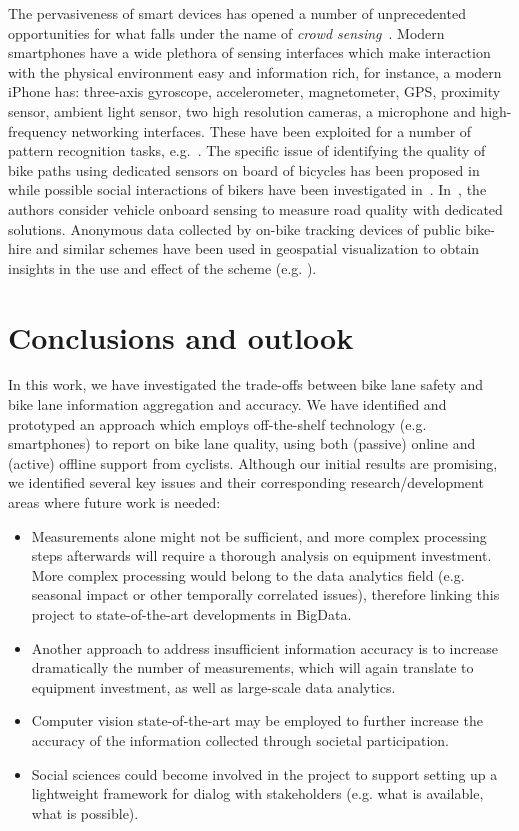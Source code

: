 \documentclass[a4paper,11pt]{article}
\begin{document}
The pervasiveness of smart devices has opened a number of unprecedented
opportunities for what falls under the name of \emph{crowd sensing}~\cite{gan:mob11}.
Modern smartphones have a wide plethora of sensing interfaces which make interaction with the physical
environment easy and information rich, for instance, a modern iPhone has: three-axis gyroscope, accelerometer, magnetometer, GPS, proximity
sensor, ambient light sensor, two high resolution cameras, a
microphone and high-frequency networking interfaces. These have been
exploited for a number of pattern recognition tasks, e.g.~\cite{fuj:iph10}. The specific issue of identifying the quality
of bike paths using dedicated sensors on board of bicycles has been
proposed in~\cite{eis:bik07} while possible social interactions of
bikers have been investigated
in~\cite{red:bik10}. In~\cite{eri:pot08}, the authors consider vehicle
onboard sensing to measure road quality with dedicated solutions.
Anonymous data collected by on-bike tracking devices of public bike-hire and similar schemes have been used in geospatial visualization to obtain insights in the use and effect of the scheme (e.g. \cite{krueger2014,wood2010}).

\section{Conclusions and outlook}

In this work, we have investigated the trade-offs between bike lane safety and bike 
lane information aggregation and accuracy. We have identified and prototyped an 
approach which employs off-the-shelf technology (e.g. smartphones) to report on bike lane quality,
using both (passive) online and (active) offline support from cyclists. 
Although our initial results are promising, we identified several key
issues and their corresponding research/development areas where future work is needed:
 
\begin{itemize}\setlength{\itemsep}{-3pt}
\item Measurements alone might not be sufficient, and more complex processing steps afterwards
will require a thorough analysis on equipment investment. More complex processing 
would belong to the data analytics field (e.g. seasonal impact or other temporally correlated issues),
therefore linking this project to state-of-the-art developments in BigData.
\item Another approach to address insufficient information accuracy is to increase dramatically the number of 
measurements, which will again translate to equipment investment, as well as large-scale data analytics.
\item Computer vision state-of-the-art may be employed to further increase the accuracy of the information collected through
societal participation.
\item Social sciences could become involved in the project to support setting up a lightweight framework for dialog with stakeholders (e.g. what is available, what is possible). 
\end{itemize}
\end{document}
